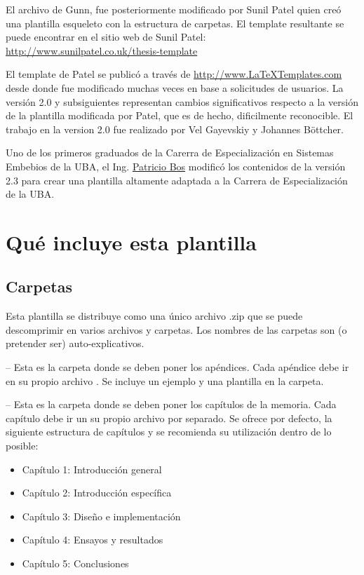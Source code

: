 El archivo de Gunn,  fue posteriormente modificado por Sunil Patel quien creó una plantilla esqueleto con la estructura de carpetas. El template resultante se puede encontrar en el sitio web de Sunil Patel:
\url{http://www.sunilpatel.co.uk/thesis-template}

El template de Patel se publicó a través de  \url{http://www.LaTeXTemplates.com} desde donde fue modificado muchas veces en base a solicitudes de usuarios. La versión 2.0 y subsiguientes representan cambios significativos respecto a la versión de la plantilla modificada por Patel, que es de hecho, dificilmente reconocible. El trabajo en la version 2.0 fue realizado por Vel Gayevskiy y Johannes Böttcher.

Uno de los primeros graduados de la Carerra de Especialización en Sistemas Embebios de la UBA, el Ing. \href{mailto:pbos@fi.uba.ar}{Patricio Bos} modificó los contenidos de la versión 2.3 para crear una plantilla altamente adaptada a la Carrera de Especialización de la UBA.


\section{Qué incluye esta plantilla}

\subsection{Carpetas}

Esta plantilla se distribuye como una único archivo .zip que se puede descomprimir en varios archivos y carpetas. Los nombres de las carpetas son (o pretender ser) auto-explicativos.

 -- Esta es la carpeta donde se deben poner los apéndices. Cada apéndice debe ir en su propio archivo . Se incluye un ejemplo y una plantilla en la carpeta.

 -- Esta es la carpeta donde se deben poner los capítulos de la memoria. Cada capítulo debe ir un su propio archivo  por separado.  Se ofrece por defecto, la siguiente estructura de capítulos y se recomienda su utilización dentro de lo posible:

\begin{itemize}
\item Capítulo 1: Introducción general	
\item Capítulo 2: Introducción específica
\item Capítulo 3: Diseño e implementación
\item Capítulo 4: Ensayos y resultados
\item Capítulo 5: Conclusiones

\end{itemize}

